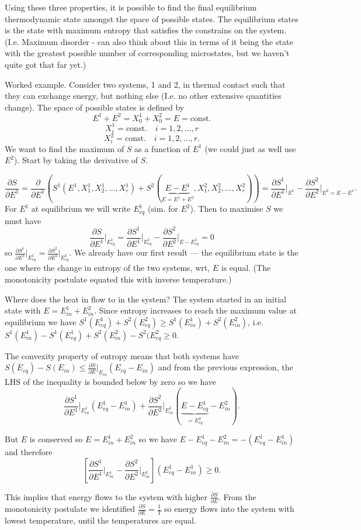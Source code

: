 Using these three properties, it is possible to find the final equilibrium thermodynamic state amongst the space of possible states. The equilibrium states is the state with maximum entropy that satisfies the constrains on the system. (I.e. Maximum disorder - can also think about this in terms of it being the state with the greatest possible number of corresponding microstates, but we haven't quite got that far yet.)

Worked example. Consider two systems, 1 and 2, in thermal contact such that they can exchange energy, but nothing else (I.e. no other extensive quantities change). The space of possible states is defined by 
$$E^1+E^2 = X_0^1+X_0^2 = E = \text{const.}$$
$$X_i^1 = \text{const.}\quad i=1,2,\ldots,r$$
$$X_i^2 = \text{const.}\quad i=1,2,\ldots,r.$$
We want to find the maximum of $S$ as a function of $E^1$ (we could just as well use $E^2$). Start by taking the derivative of $S$.

$$\frac{\partial S}{\partial E^1} = \frac{\partial}{\partial E^1}\left(S^1(E^1,X_1^1,X_2^1,\ldots,X_r^1) + S^2(\underbrace{E-E^1}_{E=E^1+E^2},X_1^2,X_2^2,\ldots,X_r^2) \right) = \frac{\partial S^1}{\partial E^1}\bigg\vert_{E^1} -  \frac{\partial S^2}{\partial E^2}\bigg\vert_{E^2=E-E^1}.$$
For $E^1$ at equilibrium we will write $E^1_{eq}$ (sim. for $E^2$). Then to maximise $S$ we must have
$$\frac{\partial S}{\partial E^1}\bigg\vert_{E^1_{eq}} = \frac{\partial S^1}{\partial E^1}\bigg\vert_{E^1_{eq}} - \frac{\partial S^2}{\partial E^2}\bigg\vert_{E-E^1_{eq}}=0$$
so $\frac{\partial S^1}{\partial E^1}\vert_{E^1_{eq}} = \frac{\partial S^2}{\partial E^2}\vert_{E_{eq}^2}$. We already have our first result --- the equilibrium state is the one where the change in entropy of the two systems, wrt, $E$ is equal. (The  monotonicity postulate equated this with inverse temperature.)

Where does the heat in flow to in the system? The system started in an initial state with $E = E^1_{in}+E^2_{in}$. Since entropy increases to reach the maximum  value at equilibrium we have $S^1(E^1_{eq}) + S^2(E^2_{eq}) \geq S^1(E^1_{in}) + S^2(E^2_{in})$, i.e. $ S^1(E^1_{in}) - S^1(E^1_{eq})  +  S^2(E^2_{in}) - S^2(E^2_{eq}\geq 0$.

The convexity property of entropy means that both systems have $S(E_{eq})-S(E_{in})\leq \frac{\partial S}{\partial E}\vert_{E_{in}}(E_{eq}-E_{in})$ and from the previous expression, the LHS of the inequality is bounded below by zero so we have
$$\frac{\partial S^1}{\partial E^1}\bigg\vert_{E^1_{in}}(E_{eq}^1-E_{in}^1) + \frac{\partial S^2}{\partial E^2}\bigg\vert_{E^2_{in}}(\underbrace{E-E_{eq}^1}_{=E^2_{eq}}-E_{in}^2).$$

But $E$ is conserved so $E=E^1_{in}+E^2_{in}$ so we have $E-E^1_{eq}-E^2_{in} = -(E^1_{eq}-E^1_{in})$ and therefore
$$\left[\frac{\partial S^1}{\partial E^1}\bigg\vert_{E^1_{in}} - \frac{\partial S^2}{\partial E^2}\bigg\vert_{E^2_{in}}\right]\left(E^1_{eq}-E^1_{in}\right)\geq 0.$$

This implies that energy flows to the  system with higher $\frac{\partial S}{\partial E}$. From the monotonicity postulate we identified  $\frac{\partial S}{\partial E}= \frac{1}{T}$ so energy flows into the system with lowest temperature, until the temperatures are equal.

